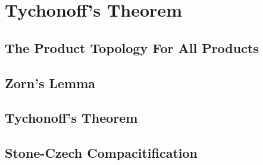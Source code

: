 \chapter{Tychonoff's Theorem}

\section{The Product Topology For All Products}



\section{Zorn's Lemma}



\section{Tychonoff's Theorem}



\section{Stone-Czech Compacitification}



